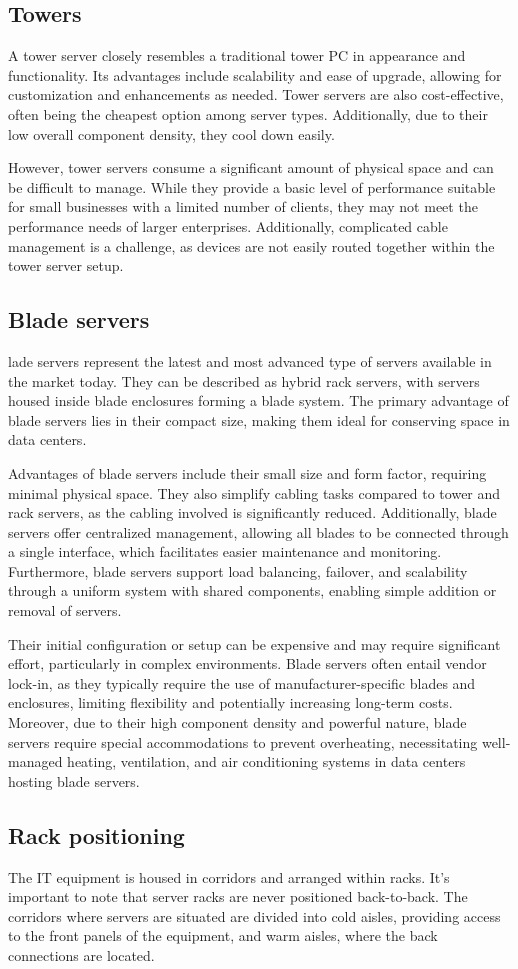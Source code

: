 \subsection{Towers}
A tower server closely resembles a traditional tower PC in appearance and functionality. 
Its advantages include scalability and ease of upgrade, allowing for customization and enhancements as needed. Tower servers are also cost-effective, often being the cheapest option among server types. 
Additionally, due to their low overall component density, they cool down easily.

However, tower servers consume a significant amount of physical space and can be difficult to manage.
While they provide a basic level of performance suitable for small businesses with a limited number of clients, they may not meet the performance needs of larger enterprises. 
Additionally, complicated cable management is a challenge, as devices are not easily routed together within the tower server setup.

\subsection{Blade servers}
lade servers represent the latest and most advanced type of servers available in the market today.
They can be described as hybrid rack servers, with servers housed inside blade enclosures forming a blade system. 
The primary advantage of blade servers lies in their compact size, making them ideal for conserving space in data centers.

Advantages of blade servers include their small size and form factor, requiring minimal physical space. 
They also simplify cabling tasks compared to tower and rack servers, as the cabling involved is significantly reduced. 
Additionally, blade servers offer centralized management, allowing all blades to be connected through a single interface, which facilitates easier maintenance and monitoring. 
Furthermore, blade servers support load balancing, failover, and scalability through a uniform system with shared components, enabling simple addition or removal of servers.

Their initial configuration or setup can be expensive and may require significant effort, particularly in complex environments.
Blade servers often entail vendor lock-in, as they typically require the use of manufacturer-specific blades and enclosures, limiting flexibility and potentially increasing long-term costs. 
Moreover, due to their high component density and powerful nature, blade servers require special accommodations to prevent overheating, necessitating well-managed heating, ventilation, and air conditioning systems in data centers hosting blade servers.

\subsection{Rack positioning}
The IT equipment is housed in corridors and arranged within racks. 
It's important to note that server racks are never positioned back-to-back. 
The corridors where servers are situated are divided into cold aisles, providing access to the front panels of the equipment, and warm aisles, where the back connections are located. 